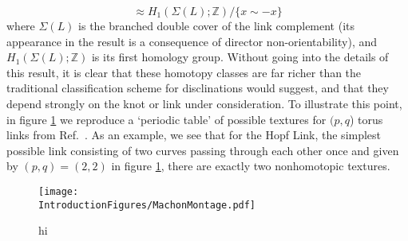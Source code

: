 \begin{equation}
[M-L, \mathbb{R}P^2] \approx H_1(\Sigma(L); \mathbb{Z})/\{ x \sim -x\}
\end{equation}
where $\Sigma(L)$ is the branched double cover of the link complement (its appearance in the result is a consequence of director non-orientability), and $H_1(\Sigma(L); \mathbb{Z})$ is its first homology group. Without going into the details of this result, it is clear that these homotopy classes are far richer than the traditional classification scheme for disclinations would suggest, and that they depend strongly on the knot or link under consideration. To illustrate this point, in figure \ref{fig:MachonMontage} we reproduce a `periodic table' of possible textures for $(p,q$) torus links from Ref.~\cite{Machon}. As an example, we see that for the Hopf Link, the simplest possible link consisting of two curves passing through each other once and given by $(p,q)=(2,2)$ in figure \ref{fig:MachonMontage}, there are exactly two nonhomotopic textures. 
\begin{figure}[htbp]
\centering
\texttt{[image: \\IntroductionFigures/MachonMontage.pdf]}
\caption{hi }
\label{fig:MachonMontage}
\end{figure}
